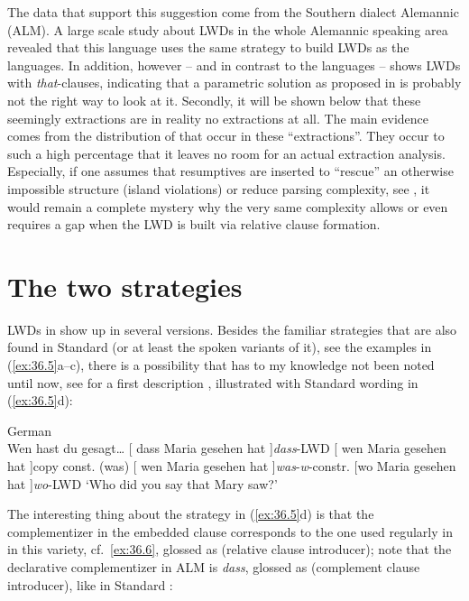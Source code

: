 \documentclass[output=paper]{langsci/langscibook}
\begin{document}
The data that support this suggestion come from the Southern  dialect
Alemannic (ALM). A large scale study about \glspl{LWD} in the whole Alemannic
speaking area revealed that this language uses the same strategy to build
\glspl{LWD} as the  languages. In addition, however -- and in contrast
to the  languages --  shows \glspl{LWD} with
\emph{that}-clauses, indicating that a parametric solution as proposed in
\citet{AdgRam2005} is probably not the right way to look at it. Secondly, it
will be shown below that these seemingly extractions are in reality no
extractions at all. The main evidence comes from the distribution of
 that occur in these “extractions”. They occur to such
a high percentage that it leaves no room for an actual extraction analysis.
Especially, if one assumes that resumptives are
inserted to \enquote{rescue} an otherwise impossible structure
(island
violations) or reduce parsing complexity, see \citet{ChaoSells1983}, it would
remain a complete mystery why the very same complexity allows or even requires
a gap when the \gls{LWD} is built via relative clause formation.

\section{The two strategies}\label{sec:36.2} %

\glspl{LWD} in  show up in several versions. Besides the
familiar strategies that are also found in Standard  (or at least
the spoken variants of it), see the examples in (\ref{ex:36.5}a--c), there is a possibility
that has to my knowledge not been noted until now, see for a first description
\textcite{BrandnerBucheli2018}, illustrated with Standard  wording
in (\ref{ex:36.5}d):

\ea\label{ex:36.5}German\\
    Wen hast du gesagt\dots{}
    \ea {}[ dass Maria \underline{\hphantom{2em}} gesehen hat ]\hfill \emph{dass}-\gls{LWD}
    \ex {}[ wen Maria\underline{\hphantom{2em}} gesehen hat ]\hfill copy const.
    \ex (was) [ wen Maria \underline{\hphantom{2em}} gesehen hat ]\hfill \emph{was}-\emph{w}-constr.
    \ex {}[wo Maria \underline{\hphantom{2em}} gesehen hat ]\hfill \emph{wo}-\gls{LWD}
    \sn \enquote*{Who did you say that Mary saw?}
    \z
\z

The interesting thing about the strategy in (\ref{ex:36.5}d) is that the
complementizer in the embedded clause corresponds to the
one used regularly in  in this variety, cf.\
\eqref{ex:36.6}, glossed as \Rci{} (relative clause introducer); note that
the declarative complementizer\is{complementizers} in ALM is \emph{dass},
glossed as \Cci{} (complement clause introducer), like in Standard
\ili{German}:
\end{document}
